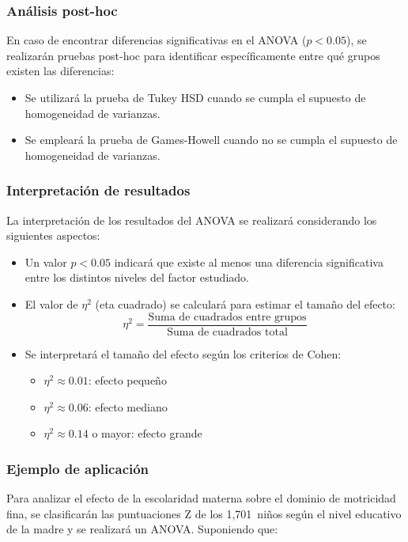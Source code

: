 \documentclass[11pt,letterpaper]{report}
\newcommand{\muestradeseada}{1,701}
\begin{document}
\subsubsection{Análisis post-hoc}
En caso de encontrar diferencias significativas en el ANOVA ($p < 0.05$), se
realizarán pruebas post-hoc para identificar específicamente entre qué grupos
existen las diferencias:

\begin{itemize}
    \item Se utilizará la prueba de Tukey HSD cuando se cumpla el supuesto de
    homogeneidad de varianzas.
    
    \item Se empleará la prueba de Games-Howell cuando no se cumpla el supuesto
    de homogeneidad de varianzas.
\end{itemize}

\subsubsection{Interpretación de resultados}
La interpretación de los resultados del ANOVA se realizará considerando los 
siguientes aspectos:

\begin{itemize}
    \item Un valor $p < 0.05$ indicará que existe al menos una diferencia 
    significativa entre los distintos niveles del factor estudiado.
    
    \item El valor de $\eta^2$ (eta cuadrado) se calculará para estimar el 
    tamaño del efecto:
    \[
    \eta^2 = \frac{\text{Suma de cuadrados entre grupos}}{\text{Suma de 
    cuadrados total}}
    \]
    
    \item Se interpretará el tamaño del efecto según los criterios de Cohen:
    \begin{itemize}
        \item $\eta^2 \approx 0.01$: efecto pequeño
        \item $\eta^2 \approx 0.06$: efecto mediano
        \item $\eta^2 \approx 0.14$ o mayor: efecto grande
    \end{itemize}
\end{itemize}

\subsubsection{Ejemplo de aplicación}
Para analizar el efecto de la escolaridad materna sobre el dominio de 
motricidad fina, se clasificarán las puntuaciones Z de los \muestradeseada\ 
niños según el nivel educativo de la madre y se realizará un ANOVA. 
Suponiendo que:
\end{document}
